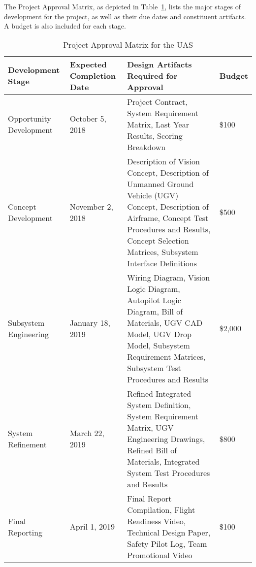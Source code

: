 

The Project Approval Matrix, as depicted in Table~\ref{tab:proj_app}, lists the major stages of development for the project, as well as their due dates and constituent artifacts. A budget is also included for each stage. 

\begin{table}[h!]
\caption{Project Approval Matrix for the UAS}\label{tab:proj_app}
\begin{tabular}{|p{4cm}|p{3.5cm}|p{5.4cm}|p{1.5cm}|}
 \hline	
\rowcolor[HTML]{C0C0C0}	
{\color[HTML]{000000} \textbf{Development Stage}} & {\color[HTML]{000000} \textbf{Expected Completion Date}} & {\color[HTML]{000000} \textbf{Design Artifacts Required for Approval}} & {\color[HTML]{000000} \textbf{Budget}}\\ \hline	
Opportunity Development & October 5, 2018 & Project Contract, System Requirement Matrix, Last Year Results, Scoring Breakdown & \$100 \\ \hline	
Concept Development & November 2, 2018 & Description of Vision Concept, Description of Unmanned Ground Vehicle (UGV) Concept, Description of Airframe, Concept Test Procedures and Results, Concept Selection Matrices, Subsystem Interface Definitions & \$500 \\ \hline	
Subsystem Engineering & January 18, 2019 & Wiring Diagram, Vision Logic Diagram, Autopilot Logic Diagram, Bill of Materials, UGV CAD Model, UGV Drop Model, Subsystem Requirement Matrices, Subsystem Test Procedures and Results & \$2,000\\ \hline	
System Refinement & March 22, 2019 & Refined Integrated System Definition, System Requirement Matrix, UGV Engineering Drawings, Refined Bill of Materials, Integrated System Test Procedures and Results & \$800\\ \hline	
Final Reporting & April 1, 2019 & Final Report Compilation, Flight Readiness Video, Technical Design Paper, Safety Pilot Log, Team Promotional Video & \$100 \\ \hline	

  \hline  
\end{tabular}

\end{table}
